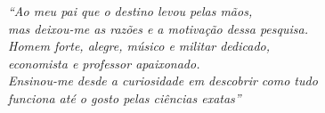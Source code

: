 
\vspace*{\fill}
  \begin{flushright}
    \textit{``Ao meu pai que o destino levou pelas mãos,\\
    	      mas deixou-me as razões e a motivação dessa pesquisa.\\ 
    	      Homem forte, alegre, músico e militar dedicado,\\
    	      economista e professor apaixonado.\\
    	      Ensinou-me desde a curiosidade em descobrir como tudo\\ funciona até o gosto pelas ciências exatas''
        	  }
  \end{flushright}